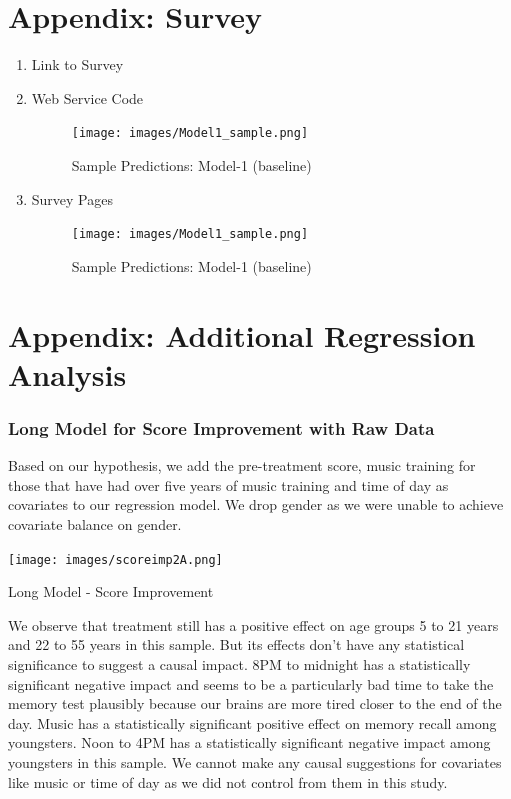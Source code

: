\documentclass[journal,onecolumn, 12pt]{article}
\begin{document}
\section{Appendix: Survey}
\label{appendix:B}
\begin{enumerate}
\item \large{Link to Survey}
\item \large{Web Service Code}
\vspace*{+2mm}
\begin{figure}[h]
    \texttt{[image: images/Model1\_sample.png]}
    \caption{Sample Predictions: Model-1 (baseline)}
    \label{fig: Model1_2}
\end{figure}

\item \large{Survey Pages}
\vspace*{+2mm}
\begin{figure}[h]
    \texttt{[image: images/Model1\_sample.png]}
    \caption{Sample Predictions: Model-1 (baseline)}
    \label{fig: Model1_2}
\end{figure}
\end{enumerate}

\clearpage
\section{Appendix: Additional Regression Analysis }
\label{appendix:C}
\subsubsection*{Long Model for Score Improvement with Raw Data}
Based on our hypothesis, we add the pre-treatment score, music training for those that have had over five years of music training and time of day as covariates to our regression model. We drop gender as we were unable to achieve covariate balance on gender. \\

\begin{table}[!b]
    \centering
    \texttt{[image: images/scoreimp2A.png]}
    \caption{Long Model - Score Improvement}
    \label{fig: scoreimp2}
\end{table}

\noindent
We observe that treatment still has a positive effect on age groups 5 to 21 years and 22 to 55 years in this sample. But its effects don't have any statistical significance to suggest a causal impact. 8PM to midnight has a statistically significant negative impact and seems to be a particularly bad time to take the memory test plausibly because our brains are more tired closer to the end of the day. Music has a statistically significant positive effect on memory recall among youngsters. Noon to 4PM has a statistically significant negative impact among youngsters in this sample. We cannot make any causal suggestions for covariates like music or time of day as we did not control from them in this study.
\end{document}
